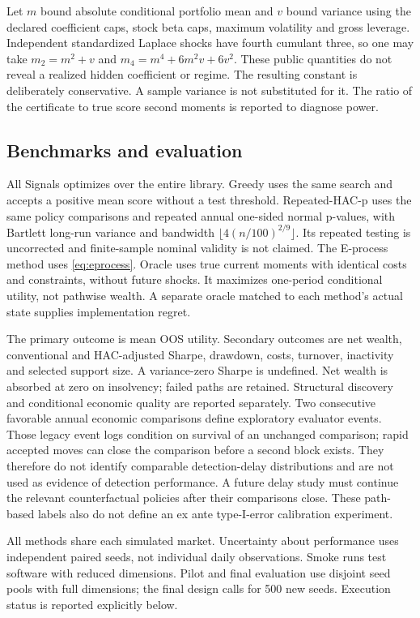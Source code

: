 \documentclass[11pt,a4paper]{article}
\theoremstyle{remark}\newtheorem{remark}[theorem]{Remark}
\begin{document}
Let $m$ bound absolute conditional portfolio mean and $v$ bound variance using
the declared coefficient caps, stock beta caps, maximum volatility and gross
leverage. Independent standardized Laplace shocks have fourth cumulant three,
so one may take
$m_2=m^2+v$ and $m_4=m^4+6m^2v+6v^2$.
These public quantities do not reveal a realized hidden coefficient or regime.
The resulting constant is deliberately conservative. A sample variance is
not substituted for it. The ratio of the certificate to true score second
moments is reported to diagnose power.

\subsection{Benchmarks and evaluation}
All Signals optimizes over the entire library. Greedy uses the same search and
accepts a positive mean score without a test threshold. Repeated-HAC-p uses
the same policy comparisons and repeated annual one-sided normal p-values,
with Bartlett long-run variance and bandwidth
$\lfloor4(n/100)^{2/9}\rfloor$. Its repeated testing is uncorrected and
finite-sample nominal validity is not claimed. The E-process method uses
\eqref{eq:eprocess}. Oracle uses true current moments with identical costs and
constraints, without future shocks. It maximizes one-period conditional
utility, not pathwise wealth. A separate oracle matched to each method's
actual state supplies implementation regret.

The primary outcome is mean OOS utility. Secondary outcomes are net wealth,
conventional and HAC-adjusted Sharpe, drawdown, costs, turnover, inactivity and
selected support size. A variance-zero Sharpe is undefined. Net wealth is
absorbed at zero on insolvency; failed paths are retained. Structural discovery
and conditional economic quality are reported separately. Two consecutive
favorable annual economic comparisons define exploratory evaluator events.
Those legacy event logs condition on survival of an unchanged comparison;
rapid accepted moves can close the comparison before a second block exists.
They therefore do not identify comparable detection-delay distributions and
are not used as evidence of detection performance. A future delay study must
continue the relevant counterfactual policies after their comparisons close.
These path-based labels also do not define an ex ante type-I-error calibration
experiment.

All methods share each simulated market. Uncertainty about performance uses
independent paired seeds, not individual daily observations. Smoke runs test
software with reduced dimensions. Pilot and final evaluation use disjoint
seed pools with full dimensions; the final design calls for 500 new seeds.
Execution status is reported explicitly below.
\end{document}
